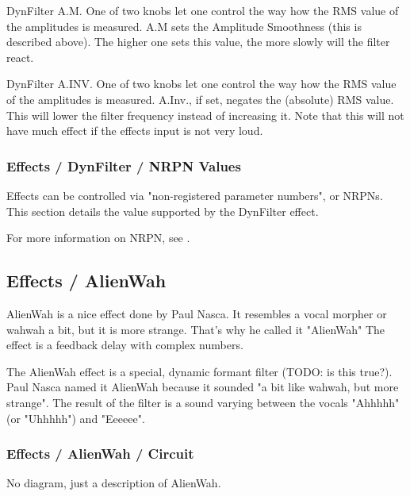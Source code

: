    DynFilter A.M.
   One of two knobs let one control the way how the RMS value of the
   amplitudes is measured.
   A.M sets the Amplitude Smoothness (this is described above). The higher
   one sets this value, the more slowly will the filter react.

   DynFilter A.INV.  One of two knobs let one control the way how the RMS
   value of the amplitudes is measured.  A.Inv., if set, negates the
   (absolute) RMS value. This will lower the filter frequency instead of
   increasing it. Note that this will not have much effect if the effects
   input is not very loud.

\subsubsection{Effects / DynFilter / NRPN Values}
\label{subsubsec:effects_edit_dynfilter_nrpn}

   Effects can be controlled via "non-registered parameter numbers", or NRPNs.
   This section details the value supported by the DynFilter effect.

   For more information on NRPN, see
   .


\subsection{Effects / AlienWah}
\label{subsec:effects_edit_alienwah}

   AlienWah is a nice effect done by Paul Nasca. It resembles a vocal morpher
   or wahwah a bit, but it is more strange. That's why he called it "AlienWah"
   The effect is a feedback delay with complex numbers. 

   The AlienWah effect is a special, dynamic formant filter (TODO: is this
   true?). Paul Nasca named it AlienWah because it sounded "a bit like
   wahwah, but more strange". The result of the filter is a sound varying
   between the vocals "Ahhhhh" (or "Uhhhhh") and "Eeeeee".

\subsubsection{Effects / AlienWah / Circuit}
\label{subsubsec:effects_edit_alienwah_circuit}

   No diagram, just a description of AlienWah.

